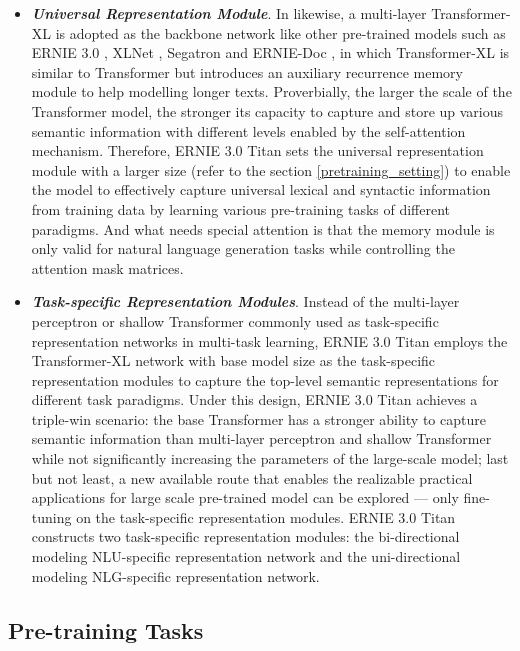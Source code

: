 \begin{itemize}
    \item \textbf{\textit{Universal Representation Module}}. In likewise, a multi-layer Transformer-XL \cite{dai2019transformer} is adopted as the backbone network like other pre-trained models such as ERNIE 3.0 \cite{sun2021ernie}, XLNet \cite{yang2019xlnet}, Segatron \cite{DBLP:journals/corr/abs-2004-14996} and ERNIE-Doc \cite{ding2020ernie}, in which Transformer-XL is similar to Transformer but introduces an auxiliary recurrence memory module to help modelling longer texts. Proverbially, the larger the scale of the Transformer model, the stronger its capacity to capture and store up various semantic information with different levels enabled by the self-attention mechanism. Therefore, ERNIE 3.0 Titan sets the universal representation module with a larger size (refer to the section \ref{pretraining_setting}) to enable the model to effectively capture universal lexical and syntactic information from training data by learning various pre-training tasks of different paradigms. And what needs special attention is that the memory module is only valid for natural language generation tasks while controlling the attention mask matrices. 
    \item \textbf{\textit{Task-specific Representation Modules}}. Instead of the multi-layer perceptron or shallow Transformer commonly used as task-specific representation networks in multi-task learning, ERNIE 3.0 Titan employs the Transformer-XL network with base model size as the task-specific representation modules to capture the top-level semantic representations for different task paradigms. Under this design, ERNIE 3.0 Titan achieves a triple-win scenario: the base Transformer has a stronger ability to capture semantic information than multi-layer perceptron and shallow Transformer while not significantly increasing the parameters of the large-scale model; last but not least, a new available route that enables the realizable practical applications for large scale pre-trained model can be explored --- only fine-tuning on the task-specific representation modules. ERNIE 3.0 Titan constructs two task-specific representation modules: the bi-directional modeling NLU-specific representation network and the uni-directional modeling NLG-specific representation network.
\end{itemize}

\subsection{Pre-training Tasks}
\label{sec:pre-training tasks}

